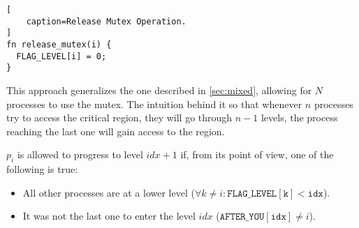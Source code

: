 \begin{lstlisting}[
    caption=Release Mutex Operation.
]
fn release_mutex(i) {
  FLAG_LEVEL[i] = 0;
}
\end{lstlisting}

This approach generalizes the one described in \autoref{sec:mixed},
allowing for $N$ processes to use the mutex.
The intuition behind it so that whenever $n$ processes try to access the critical region,
they will go through $n-1$ levels, the process reaching the last one will gain access to the region.

$p_i$ is allowed to progress to level $idx + 1$ if, from its point of view, one of the following is true:
\begin{itemize}
    \item All other processes are at a lower level ($\forall k \neq i : \mathtt{FLAG\_LEVEL[k] < idx}$).
    \item It was not the last one to enter the level $idx$ ($\mathtt{AFTER\_YOU[idx]} \neq i$).
\end{itemize}

